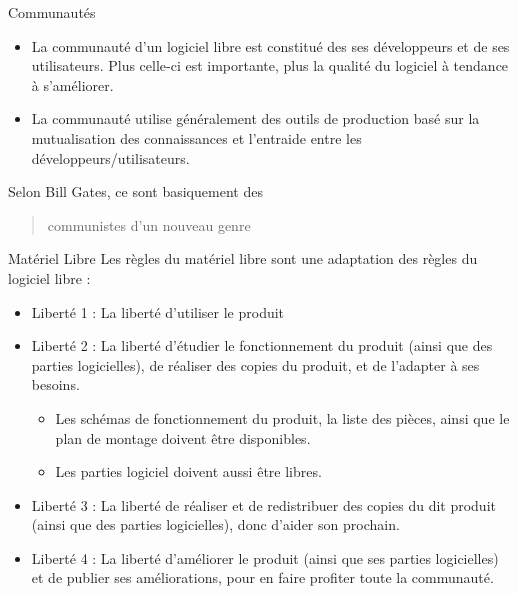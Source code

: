 \documentclass{beamer}
\begin{document}
\begin{frame}{Communautés}
\begin{itemize}
    \item La communauté d'un logiciel libre est constitué des ses développeurs et de ses utilisateurs. Plus celle-ci est importante, plus la qualité du logiciel à tendance à s'améliorer.
    \item La communauté utilise généralement des outils de production basé sur la mutualisation des connaissances et l'entraide entre les développeurs/utilisateurs.
 \end{itemize}
 Selon Bill Gates, ce sont basiquement des \begin{quote}{communistes d'un nouveau genre}\end{quote}
\end{frame}

\begin{frame}{Matériel Libre}
 Les règles du matériel libre sont une adaptation des règles du logiciel libre : 
 \begin{itemize}
    \item Liberté 1 : La liberté d'utiliser le produit
    \item Liberté 2 : La liberté d'étudier le fonctionnement du produit (ainsi que des parties logicielles), de réaliser des copies du produit, et de l'adapter à ses besoins. 
    \begin{itemize}
        \item Les schémas de fonctionnement du produit, la liste des pièces, ainsi que le plan de montage doivent être disponibles.
        \item Les parties logiciel doivent aussi être libres.
    \end{itemize}
    \item Liberté 3 : La liberté de réaliser et de redistribuer des copies du dit produit (ainsi que des parties logicielles), donc d'aider son prochain.
    \item Liberté 4 : La liberté d'améliorer le produit (ainsi que ses parties logicielles) et de publier ses améliorations, pour en faire profiter toute la communauté.
 \end{itemize}

\end{frame}



\end{document}
